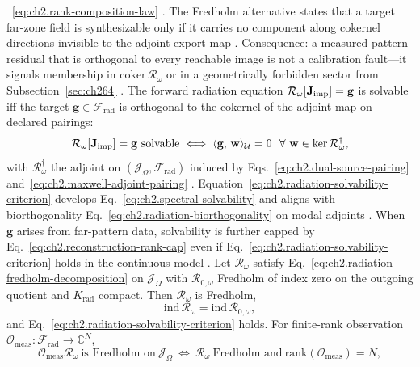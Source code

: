 ~\eqref{eq:ch2.rank-composition-law} \cite{stratton1941}.
The Fredholm alternative states that a target far-zone field is synthesizable only if it
carries no component along cokernel directions invisible to the adjoint export map
\cite{stratton1941}. Consequence: a measured pattern residual that is orthogonal to every
reachable image is not a calibration fault---it signals membership in
$\mathrm{coker}\,\mathcal{R}_\omega$ or in a geometrically forbidden sector from
Subsection~\ref{sec:ch264} \cite{harrington2001}. The forward radiation equation $\mathcal{R}_\omega[\mathbf{J}_{\mathrm{imp}}]=\mathbf{g}$
is solvable iff the target $\mathbf{g}\in\mathcal{F}_{\mathrm{rad}}$ is orthogonal to the
cokernel of the adjoint map on declared pairings:
\begin{equation}
\label{eq:ch2.radiation-solvability-criterion}
\mathcal{R}_\omega[\mathbf{J}_{\mathrm{imp}}]=\mathbf{g}
\ \text{solvable}
\iff
\langle \mathbf{g},\,\mathbf{w}\rangle_{\mathcal{U}}=0
\ \ \forall\ \mathbf{w}\in\ker\mathcal{R}_\omega^{\dagger},
\end{equation}
with \(\mathcal{R}_\omega^{\dagger}\) the adjoint on
\((\mathcal{J}_\Omega,\mathcal{F}_{\mathrm{rad}})\) induced by
Eqs.~\eqref{eq:ch2.dual-source-pairing} and~\eqref{eq:ch2.maxwell-adjoint-pairing}
\cite{stratton1941}. Equation~\eqref{eq:ch2.radiation-solvability-criterion}
develops Eq.~\eqref{eq:ch2.spectral-solvability} and aligns with biorthogonality
Eq.~\eqref{eq:ch2.radiation-biorthogonality} on modal adjoints
\cite{stratton1941}. When \(\mathbf{g}\) arises from far-pattern data, solvability is
further capped by Eq.~\eqref{eq:ch2.reconstruction-rank-cap} even if
Eq.~\eqref{eq:ch2.radiation-solvability-criterion} holds in the continuous model
\cite{harrington2001}.
\label{thm:ch2.radiation-fredholm-structure}
Let \(\mathcal{R}_\omega\) satisfy Eq.~\eqref{eq:ch2.radiation-fredholm-decomposition} on
\(\mathcal{J}_\Omega\) with \(\mathcal{R}_{0,\omega}\) Fredholm of index zero on the outgoing
quotient and \(K_{\mathrm{rad}}\) compact. Then \(\mathcal{R}_\omega\) is Fredholm,
\begin{equation}
\label{eq:ch2.radiation-index-stability}
\mathrm{ind}\,\mathcal{R}_\omega
=
\mathrm{ind}\,\mathcal{R}_{0,\omega},
\end{equation}
and Eq.~\eqref{eq:ch2.radiation-solvability-criterion} holds. For finite-rank observation
\(\mathcal{O}_{\mathrm{meas}}:\mathcal{F}_{\mathrm{rad}}\to\mathbb{C}^{N}\),
\begin{equation}
\label{eq:ch2.observation-fredholm-composition}
\mathcal{O}_{\mathrm{meas}}\mathcal{R}_\omega
\ \text{is Fredholm on}\ \mathcal{J}_\Omega
\ \Longleftrightarrow\
\mathcal{R}_\omega\ \text{Fredholm and}\ 
\mathrm{rank}(\mathcal{O}_{\mathrm{meas}})=N,
\end{equation}
